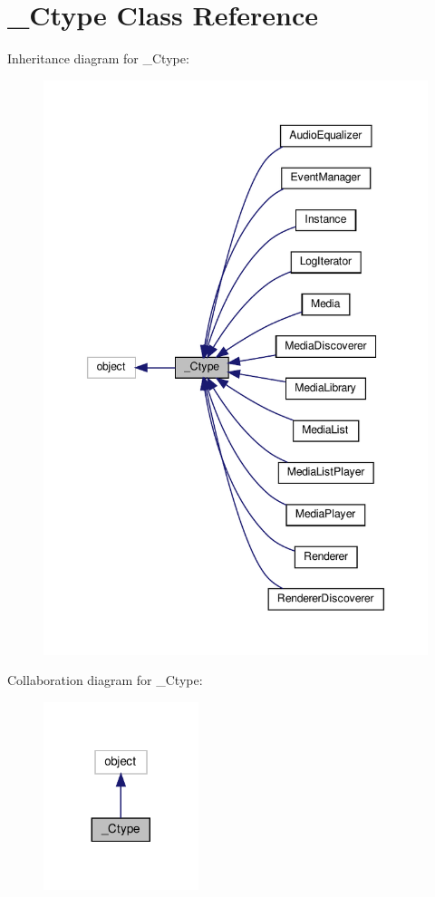 \hypertarget{classvlc_1_1___ctype}{}\section{\+\_\+\+Ctype Class Reference}
\label{classvlc_1_1___ctype}


Inheritance diagram for \+\_\+\+Ctype\+:
\nopagebreak
\begin{figure}[H]
\begin{center}
\leavevmode
\includegraphics[width=347pt]{classvlc_1_1___ctype__inherit__graph}
\end{center}
\end{figure}


Collaboration diagram for \+\_\+\+Ctype\+:
\nopagebreak
\begin{figure}[H]
\begin{center}
\leavevmode
\includegraphics[width=128pt]{classvlc_1_1___ctype__coll__graph}
\end{center}
\end{figure}
